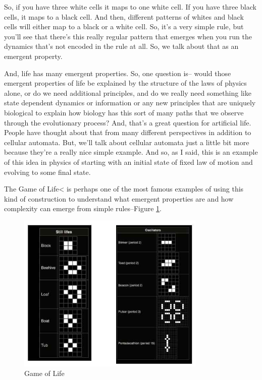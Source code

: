 \documentclass[]{article}
\begin{document}
So, if you have three white cells
it maps to one white cell.
If you have three black cells,
it maps to a black cell.
And then, different patterns
of whites and black cells
will either map to a black
or a white cell.
So, it's a very simple rule,
but you'll see that there's this
really regular pattern that emerges
when you run the dynamics
that's not encoded in the rule at all.
So, we talk about that
as an emergent property.


And, life has many emergent properties.
So, one question is--
would those emergent properties of life
be explained by the structure
of the laws of physics alone,
or do we need additional principles,
and do we really need something
like state dependent dynamics
or information
or any new principles
that are uniquely biological
to explain how biology has
this sort of many paths
that we observe
through the evolutionary process?
And, that's a great question
for artificial life.
People have thought about that
from many different perspectives
in addition to cellular automata.
But, we'll talk about cellular automata
just a little bit more
because they're a really
nice simple example.
And so, as I said,
this is an example of this idea in physics
of starting with an initial state
of fixed law of motion
and evolving to some final state.

The Game of Life< is perhaps
one of the most famous examples
of using this kind of construction
to understand
what emergent properties are
and how complexity can emerge
from simple rules--Figure \ref{fig:GameOfLife}.

\begin{figure}[H]
	\caption[Game of Life]{Game of Life\cite{wiki:game:life}}\label{fig:GameOfLife}
	\includegraphics[width=0.8\textwidth]{GameOfLife}
\end{figure}
\end{document}
